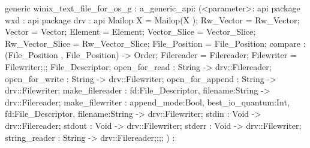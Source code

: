 generic winix_text_file_for_os_g
:
a_generic_api:
(<parameter>:
api {   package wxd
          : api {   package drv
                      : api {
                            Mailop X = Mailop(X );
                            Rw_Vector  = Rw_Vector;
                            Vector  = Vector;
                            Element  = Element;
                            Vector_Slice  = Vector_Slice;
                            Rw_Vector_Slice  = Rw_Vector_Slice;
                            File_Position  = File_Position;
                            compare : (File_Position , File_Position) -> Order;
                            Filereader = Filereader;
                            Filewriter = Filewriter;};;
                File_Descriptor;
                open_for_read : String -> drv::Filereader;
                open_for_write : String -> drv::Filewriter;
                open_for_append : String -> drv::Filewriter;
                make_filereader : {fd:File_Descriptor, filename:String} -> drv::Filereader;
                    make_filewriter :
                    {append_mode:Bool, best_io_quantum:Int, fd:File_Descriptor, filename:String} -> drv::Filewriter;
                stdin : Void -> drv::Filereader;
                stdout : Void -> drv::Filewriter;
                stderr : Void -> drv::Filewriter;
                string_reader : String -> drv::Filereader;};;};
)
:
